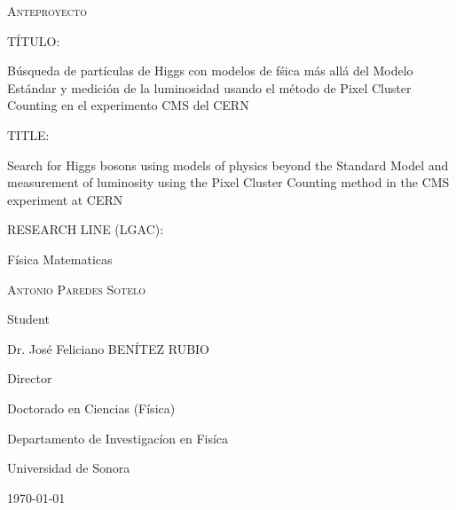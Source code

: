\documentclass[final,3p]{CSP}
\def\Student{Antonio Paredes Sotelo}
\def\Title{Anteproyecto}
\def\Prog{Doctorado en Ciencias (F\'{i}sica) }
\def\Dept{Departamento de Investigac\'{i}on en Fis\'{i}ca}
\def\Director{Dr. Jos\'{e} Feliciano BEN\'{I}TEZ RUBIO}
\def\ProjectTitle{B\'usqueda de part\'iculas de Higgs con modelos de f\'sica m\'as all\'a del Modelo Est\'andar y medici\'on de la luminosidad usando el m\'etodo de Pixel Cluster Counting en el experimento CMS del CERN}
\def\ProjectTitleEnglish{Search for Higgs bosons using models of physics beyond the Standard Model and measurement of luminosity using the Pixel Cluster Counting method in the CMS experiment at CERN}
\def\ResearchLine{F\'{i}sica Matematicas}
\begin{document}
\begin{titlepage}
  \centering
  \hspace{0pt}
  \vfill
        {\scshape\Large \Title \par}

	\vspace{1cm}
        \begin{adjustwidth}{2cm}{2cm}{
            T\'ITULO:\par
            {\large \ProjectTitle \par}
          }
          \end{adjustwidth}

        \vspace{0.5cm}
        \begin{adjustwidth}{2cm}{2cm}{
            TITLE:\par
            {\large \ProjectTitleEnglish \par}
          }
          \end{adjustwidth}
          
	\vspace{0.5cm}
        \begin{adjustwidth}{2cm}{2cm}{
            RESEARCH LINE (LGAC):  \par
            \ResearchLine \par}
        \end{adjustwidth}

        
        \vspace{4cm}
        {\underline{\hspace{8cm}}\par}
	{\scshape\large \Student \par}
        {Student\par}

        \vspace{1cm}
        {\underline{\hspace{8cm}}\par}
	{\Director \par}
        {Director\par}

        \vspace{1cm}
        {\Prog \par}
        {\Dept \par}
        {Universidad de Sonora \par}

        \vspace{4cm}
	{\today}

\hspace{0pt}
\vfill

\end{titlepage}
\end{document}

